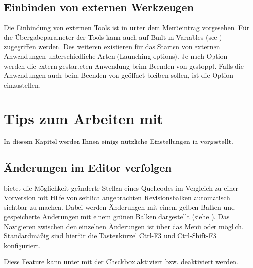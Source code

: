 \subsection{Einbinden von externen Werkzeugen}

Die Einbindung von externen Tools ist in \codeblocks unter dem Menüeintrag  vorgesehen. Für die Übergabeparameter der Tools kann auch auf Built-in Variables (see ) zugegriffen werden. Des weiteren existieren für das Starten von externen Anwendungen unterschiedliche Arten (Launching options). Je nach Option werden die extern gestarteten Anwendung beim Beenden von \codeblocks gestoppt. Falls die Anwendungen auch beim Beenden von \codeblocks geöffnet bleiben sollen, ist die Option  einzustellen.

\section{Tips zum Arbeiten mit \codeblocks}

In diesem Kapitel werden Ihnen einige nützliche Einstellungen in \codeblocks vorgestellt.

\subsection{Änderungen im Editor verfolgen}

\codeblocks bietet die Möglichkeit geänderte Stellen eines Quellcodes im Vergleich zu einer Vorversion mit Hilfe von seitlich angebrachten Revisionsbalken automatisch sichtbar zu machen. Dabei werden Änderungen mit einem gelben Balken und gespeicherte Änderungen mit einem grünen Balken dargestellt (siehe ). Das Navigieren zwischen den einzelnen Änderungen ist über das Menü  oder  möglich. Standardmäßig sind hierfür die Tastenkürzel Ctrl-F3 und Ctrl-Shift-F3 konfiguriert.


Diese Feature kann unter  mit der Checkbox  aktiviert bzw. deaktiviert werden.


